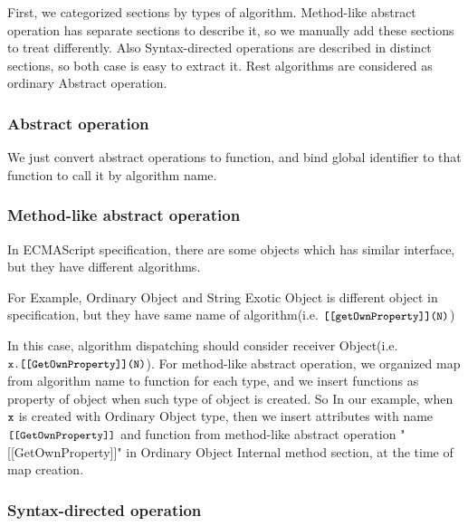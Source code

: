 First, we categorized sections by types of algorithm.
Method-like abstract operation has separate sections to describe it, so we manually add these sections to treat differently.
Also Syntax-directed operations are described in distinct sections, so both case is easy to extract it.
Rest algorithms are considered as ordinary Abstract operation.

\subsubsection{Abstract operation}

We just convert abstract operations to function, and bind global identifier to that function to call it by algorithm name.

\subsubsection{Method-like abstract operation}

In ECMAScript specification, there are some objects which has similar interface, but they have different algorithms. 

For Example, Ordinary Object and String Exotic Object is different object in specification, but they have same name of algorithm(i.e. \( \texttt{\small[[getOwnProperty]](N)} \))

In this case, algorithm dispatching should consider receiver Object(i.e. \( \texttt{\small x.[[GetOwnProperty]](N)} \)).
For method-like abstract operation, we organized map from algorithm name to function for each type,
 and we insert functions as property of object when such type of object is created. So In our example, when  \( \texttt{\small x} \) is created with Ordinary Object type,
 then we insert attributes with name \( \texttt{\small[[GetOwnProperty]]} \) and function from method-like abstract operation "[[GetOwnProperty]]" in Ordinary Object Internal method section, at the time of map creation.

 \subsubsection{Syntax-directed operation}
 
